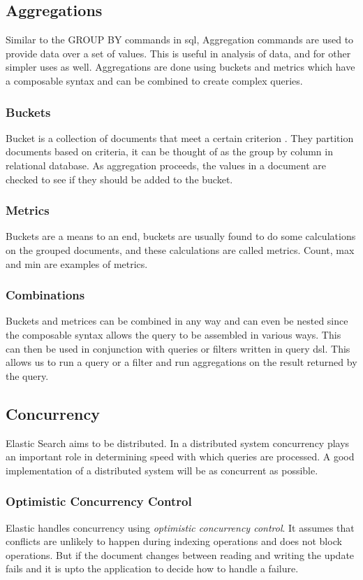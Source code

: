 \documentclass[12pt]{article}
\begin{document}
 		\subsection{Aggregations}
				Similar to the GROUP BY commands in \ac{sql}, Aggregation commands are used to provide data over a set of values. This is useful in analysis of data, and for other simpler uses as well. Aggregations are done using buckets and metrics which have a composable syntax and can be combined to create complex queries.

			\subsubsection{Buckets}
				Bucket is a collection of documents that meet a certain criterion \cite{book}. They partition documents based on criteria, it can be thought of as the group by column in relational database. As aggregation proceeds, the values in a document are checked to see if they should be added to the bucket.

			\subsubsection{Metrics}
				Buckets are a means to an end, buckets are usually found to do some calculations on the grouped documents, and these calculations are called metrics. Count, max and min are examples of metrics.

			\subsubsection{Combinations}
				Buckets and metrices can be combined in any way and can even be nested since the composable syntax allows the query to be assembled in various ways. This can then be used in conjunction with queries or filters written in query \ac{dsl}. This allows us to run a query or a filter and run aggregations on the result returned by the query.

		\subsection{Concurrency}
			Elastic Search aims to be distributed. In a distributed system concurrency plays an important role in determining speed with which queries are processed. A good implementation of a distributed system will be as concurrent as possible. 

			\subsubsection{Optimistic Concurrency Control}
				Elastic handles concurrency using \emph{optimistic concurrency control}. It assumes that conflicts are unlikely to happen during indexing operations and does not block operations\cite{book}. But if the document changes between reading and writing the update fails and it is upto the application to decide how to handle a failure. 
\end{document}
